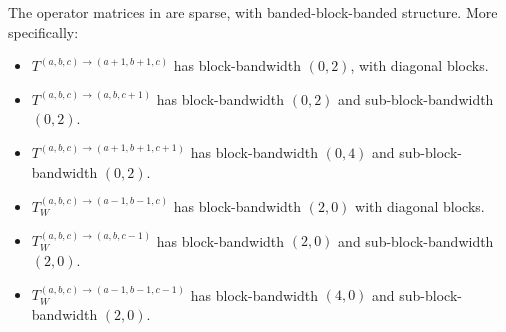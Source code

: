 \begin{lemma}\label{lemma:ds:sparsityofparametertransformationoperators}
	The operator matrices in  are sparse, with banded-block-banded structure. More specifically:
\begin{itemize}
	\item $T^{(a,b,c)\to(a+1,b+1,c)}$ has block-bandwidth $(0,2)$, with diagonal blocks.
  	\item $T^{(a,b,c)\to(a,b,c+1)}$ has block-bandwidth $(0,2)$ and sub-block-bandwidth $(0,2)$.
	\item $T^{(a,b,c)\to(a+1,b+1,c+1)}$ has block-bandwidth $(0,4)$ and sub-block-bandwidth $(0,2)$.
	\item $T_W^{(a,b,c)\to(a-1,b-1,c)}$ has block-bandwidth $(2,0)$ with diagonal blocks.
  	\item $T_W^{(a,b,c)\to(a,b,c-1)}$ has block-bandwidth $(2,0)$ and sub-block-bandwidth $(2,0)$.
	\item $T_W^{(a,b,c)\to(a-1,b-1,c-1)}$ has block-bandwidth $(4,0)$ and sub-block-bandwidth $(2,0)$.
\end{itemize}
\end{lemma}

